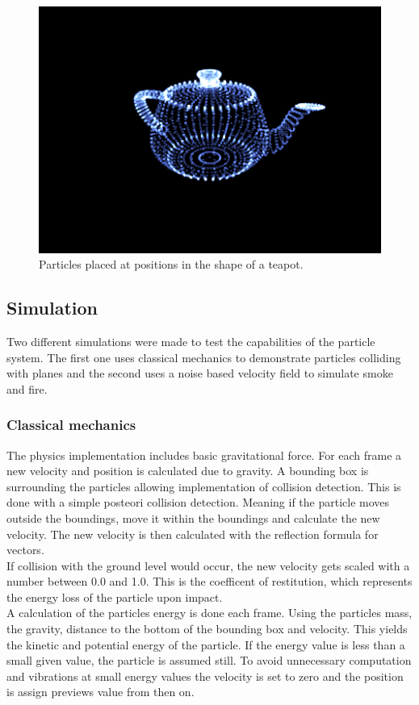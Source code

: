 \documentclass[report]{vgtc}
\begin{document}
\begin{figure}[H]
\includegraphics[scale=0.5]{img/teapot.png}
\caption{Particles placed at positions in the shape of a teapot.}
\end{figure}

\subsection{Simulation}
Two different simulations were made to test the capabilities of the particle system. The first one uses classical mechanics to demonstrate particles colliding with planes and the second uses a noise based velocity field to simulate smoke and fire. 


\subsubsection{Classical mechanics}
The physics implementation includes basic gravitational force. For each frame a new velocity and position is calculated due to gravity. 
A bounding box is surrounding the particles allowing implementation of collision detection. This is done with a simple posteori collision detection. Meaning if the particle moves outside the boundings, move it within the boundings and calculate the new velocity. The new velocity is then calculated with the reflection formula for vectors.\\
If collision with the ground level would occur, the new velocity gets scaled with a number between 0.0 and 1.0. This is the coefficent of restitution, which represents the energy loss of the particle upon impact.\\
A calculation of the particles energy is done each frame. Using the particles mass, the gravity, distance to the bottom of the bounding box and velocity. This yields the kinetic and potential energy of the particle. If the energy value is less than a small given value, the particle is assumed still. To avoid unnecessary computation and vibrations at small energy values the velocity is set to zero and the position is assign previews value from then on.
\end{document}
